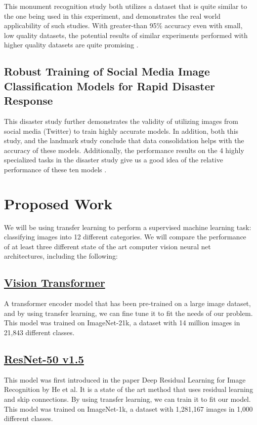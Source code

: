 \documentclass{article}
\begin{document}
This monument recognition study both utilizes a dataset that is quite similar to the one being used in this experiment, and demonstrates the real world applicability of such studies. With greater-than 95\% accuracy even with small, low quality datasets, the potential results of similar experiments performed with higher quality datasets are quite promising \parencite{Landmark}.

\subsection*{Robust Training of Social Media Image Classification Models for Rapid Disaster Response}

This disaster study further demonstrates the validity of utilizing images from social media (Twitter) to train highly accurate models. In addition, both this study, and the landmark study conclude that data consolidation helps with the accuracy of these models. Additionally, the performance results on the 4 highly specialized tasks in the disaster study give us a good idea of the relative performance of these ten models \parencite{Robust}.

\section*{Proposed Work}

We will be using transfer learning to perform a supervised machine learning task: classifying images into 12 different categories. We will compare the performance of at least three different state of the art computer vision neural net architectures, including the following:

\subsection*{\href{https://huggingface.co/google/vit-base-patch16-224}{Vision Transformer}}
A transformer encoder model that has been pre-trained on a large image dataset, and by using transfer learning, we can fine tune it to fit the needs of our problem. This model was trained on ImageNet-21k, a dataset with 14 million images in 21,843 different classes.

\subsection*{\href{https://huggingface.co/microsoft/resnet-50}{ResNet-50 v1.5}}
This model was first introduced in the paper Deep Residual Learning for Image Recognition by He et al. It is a state of the art method that uses residual learning and skip connections. By using transfer learning, we can train it to fit our model. This model was trained on ImageNet-1k, a dataset with 1,281,167 images in 1,000 different classes.
\end{document}
